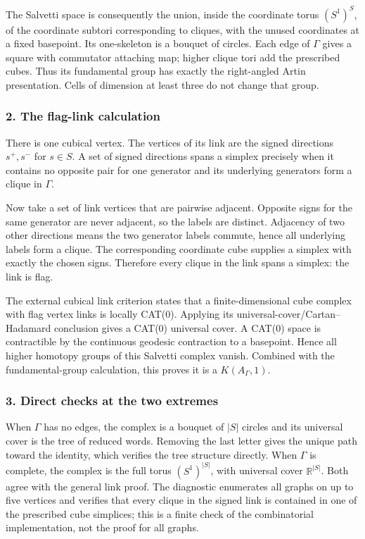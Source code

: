\documentclass[11pt]{article}
\begin{document}
The Salvetti space is consequently the union, inside the coordinate torus $(S^1)^S$, of the coordinate subtori corresponding to cliques, with the unused coordinates at a fixed basepoint. Its one-skeleton is a bouquet of circles. Each edge of $\Gamma$ gives a square with commutator attaching map; higher clique tori add the prescribed cubes. Thus its fundamental group has exactly the right-angled Artin presentation. Cells of dimension at least three do not change that group.

\subsubsection{2. The flag-link calculation}
There is one cubical vertex. The vertices of its link are the signed directions $s^+,s^-$ for $s\in S$. A set of signed directions spans a simplex precisely when it contains no opposite pair for one generator and its underlying generators form a clique in $\Gamma$.

Now take a set of link vertices that are pairwise adjacent. Opposite signs for the same generator are never adjacent, so the labels are distinct. Adjacency of two other directions means the two generator labels commute, hence all underlying labels form a clique. The corresponding coordinate cube supplies a simplex with exactly the chosen signs. Therefore every clique in the link spans a simplex: the link is flag.

The external cubical link criterion states that a finite-dimensional cube complex with flag vertex links is locally CAT(0). Applying its universal-cover/Cartan--Hadamard conclusion gives a CAT(0) universal cover. A CAT(0) space is contractible by the continuous geodesic contraction to a basepoint. Hence all higher homotopy groups of this Salvetti complex vanish. Combined with the fundamental-group calculation, this proves it is a $K(A_\Gamma,1)$.

\subsubsection{3. Direct checks at the two extremes}
When $\Gamma$ has no edges, the complex is a bouquet of $|S|$ circles and its universal cover is the tree of reduced words. Removing the last letter gives the unique path toward the identity, which verifies the tree structure directly. When $\Gamma$ is complete, the complex is the full torus $(S^1)^{|S|}$, with universal cover $\mathbb R^{|S|}$. Both agree with the general link proof. The diagnostic enumerates all graphs on up to five vertices and verifies that every clique in the signed link is contained in one of the prescribed cube simplices; this is a finite check of the combinatorial implementation, not the proof for all graphs.
\end{document}
